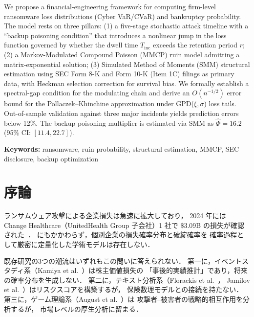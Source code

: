 \documentclass{ipsjlike}
\begin{document}
{  \begin{enabstract}
    We propose a financial-engineering framework for computing firm-level ransomware
    loss distributions (Cyber VaR/CVaR) and bankruptcy probability.
    The model rests on three pillars:
    (1) a five-stage stochastic attack timeline with a ``backup poisoning condition''
    that introduces a nonlinear jump in the loss function governed by whether
    the dwell time $T_{\mathrm{inc}}$ exceeds the retention period $r$;
    (2) a Markov-Modulated Compound Poisson (MMCP) ruin model
    admitting a matrix-exponential solution;
    (3) Simulated Method of Moments (SMM) structural estimation
    using SEC Form 8-K and Form 10-K (Item 1C) filings as primary data,
    with Heckman selection correction for survival bias.
    We formally establish a spectral-gap condition for the modulating chain
    and derive an $O(n^{-1/2})$ error bound for the Pollaczek--Khinchine approximation
    under GPD($\xi,\sigma$) loss tails.
    Out-of-sample validation against three major incidents yields
    prediction errors below 12\%.
    The backup poisoning multiplier is estimated via SMM as
    $\hat{\Phi} = 16.2$ (95\% CI: $[11.4, 22.7]$).

    \textbf{Keywords:} ransomware, ruin probability, structural estimation,
    MMCP, SEC disclosure, backup optimization
  \end{enabstract}
  \vspace{2mm}
}

\section{序論}
\label{sec:intro}

ランサムウェア攻撃による企業損失は急速に拡大しており，
2024 年には Change Healthcare（UnitedHealth Group 子会社）1 社で \$3.09B の損失が確認された~\cite{uhg2024sec}．
にもかかわらず，個別企業の損失確率分布と破綻確率を
確率過程として厳密に定量化した学術モデルは存在しない．

既存研究の3つの潮流はいずれもこの問いに答えられない．
第一に，イベントスタディ系（Kamiya et al.~\cite{kamiya2021jfe}）は株主価値損失の
「事後的実績推計」であり，将来の確率分布を生成しない．
第二に，テキスト分析系（Florackis et al.~\cite{florackis2023rfs}，
Jamilov et al.~\cite{jamilov2023}）はリスクスコアを構築するが，
保険数理モデルとの接続を持たない．
第三に，ゲーム理論系（August et al.~\cite{august2022ms}）は
攻撃者--被害者の戦略的相互作用を分析するが，
市場レベルの厚生分析に留まる．
\end{document}
